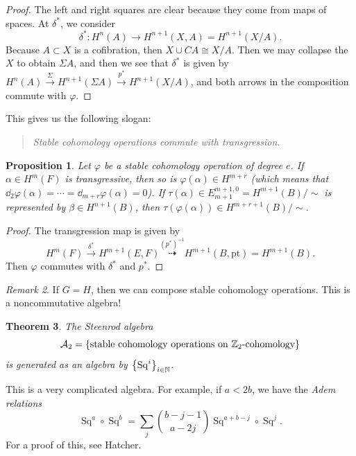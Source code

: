 \documentclass[leqno, openany]{memoir}
\newtheorem{thm}{Theorem}[section]
\newtheorem{prop}[thm]{Proposition}
\theoremstyle{definition}
\theoremstyle{remark}
\newtheorem{rmk}[thm]{Remark}
\theoremstyle{plain}
\theoremstyle{definition}
\theoremstyle{remark}
\newcommand{\Z}{\mathbb{Z}}
\newcommand{\mc}[1]{\mathcal{#1}}
\newcommand{\mr}[1]{\mathrm{#1}}
\DeclareMathOperator{\Sq}{Sq}
\begin{document}
\begin{proof}
    The left and right squares are clear because they come from maps of spaces. At $\delta^*$, we consider 
    \[ \delta^* \colon H^n(A) \to H^{n+1}(X, A) = H^{n+1}(X/A). \]
    Because $A \subset X$ is a cofibration, then $X \cup C A \cong X/A$. Then we may collapse the $X$ to obtain $\Sigma A$, and then we see that $\delta^*$ is given by $H^n(A) \xrightarrow{\Sigma} H^{n+1}(\Sigma A) \xrightarrow{p^*} H^{n+1}(X/A)$, and both arrows in the composition commute with $\varphi$.
\end{proof}

This gives us the following slogan:

\begin{quotation}
    \textit{Stable cohomology operations commute with transgression.} 
\end{quotation}

\begin{prop}
    Let $\varphi$ be a stable cohomology operation of degree $e$. If $\alpha \in H^m(F)$ is transgressive, then so is $\varphi(\alpha) \in H^{m+r}$ (which means that $\dd_2 \varphi(\alpha) = \cdots = \dd_{m+r} \varphi(\alpha) = 0$). If $\tau(\alpha) \in E^{m+1, 0}_{m+1} = H^{m+1}(B)/\sim$ is represented by $\beta \in H^{n+1}(B)$, then $\tau (\varphi(\alpha)) \in H^{m+r+1}(B) /\sim$.
\end{prop}

\begin{proof}
    The transgression map is given by 
    \[ H^m(F) \xrightarrow{\delta^*} H^{m+1}(E, F) \overset{{(p^*)}^{-1}}{\dashrightarrow} H^{m+1}(B, \mr{pt}) = H^{m+1}(B). \]
    Then $\varphi$ commutes with $\delta^*$ and $p^*$.
\end{proof}

\begin{rmk}
    If $G = H$, then we can compose stable cohomology operations. This is a noncommutative algebra!
\end{rmk}

\begin{thm}
    The \textit{Steenrod algebra}
    \[ \mc{A}_2 = \qty{\text{stable cohomology operations on $\Z_2$-cohomology}} \]
    is generated as an algebra by $\qty{\Sq^i}_{i \in \mathbb{N}}$.
\end{thm}

This is a very complicated algebra. For example, if $a < 2b$, we have the \textit{Adem relations} 
\[ \Sq^a \circ \Sq^b = \sum_j \binom{b-j-1}{a-2j} \Sq^{a+b-j} \circ \Sq^j. \]
For a proof of this, see Hatcher.
\end{document}
